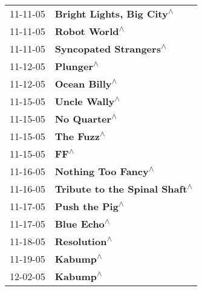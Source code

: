 \begin{supertabular}{p{0.25\columnwidth}p{0.75\columnwidth}}
 11-11-05 &                                                  \textbf{Bright Lights, Big City\textsuperscript{$\wedge$}} \\
 11-11-05 &                                                              \textbf{Robot World\textsuperscript{$\wedge$}} \\
 11-11-05 &                                                     \textbf{Syncopated Strangers\textsuperscript{$\wedge$}} \\
 11-12-05 &                                                                  \textbf{Plunger\textsuperscript{$\wedge$}} \\
 11-12-05 &                                                              \textbf{Ocean Billy\textsuperscript{$\wedge$}} \\
 11-15-05 &                                                              \textbf{Uncle Wally\textsuperscript{$\wedge$}} \\
 11-15-05 &                                                               \textbf{No Quarter\textsuperscript{$\wedge$}} \\
 11-15-05 &                                                                 \textbf{The Fuzz\textsuperscript{$\wedge$}} \\
 11-15-05 &                                                                       \textbf{FF\textsuperscript{$\wedge$}} \\
 11-16-05 &                                                        \textbf{Nothing Too Fancy\textsuperscript{$\wedge$}} \\
 11-16-05 &                                              \textbf{Tribute to the Spinal Shaft\textsuperscript{$\wedge$}} \\
 11-17-05 &                                                             \textbf{Push the Pig\textsuperscript{$\wedge$}} \\
 11-17-05 &                                                                \textbf{Blue Echo\textsuperscript{$\wedge$}} \\
 11-18-05 &                                                               \textbf{Resolution\textsuperscript{$\wedge$}} \\
 11-19-05 &                                                                   \textbf{Kabump\textsuperscript{$\wedge$}} \\
 12-02-05 &                                                                   \textbf{Kabump\textsuperscript{$\wedge$}} \\

\end{supertabular}
